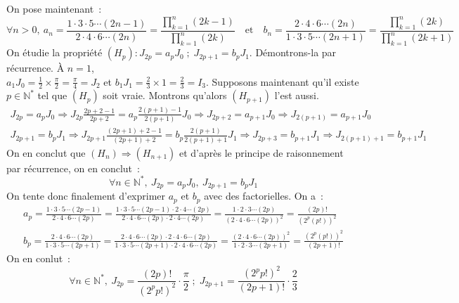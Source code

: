 \documentclass{article}
\begin{document}
  On pose maintenant~:
  \begin{displaymath}
    \forall n>0,\ a_n = \frac{1\cdot3\cdot5\cdots(2n-1)}{2\cdot4\cdot6\cdots(2n)}=\frac{\prod_{k=1}^n (2k-1)}{\prod_{k=1}^n(2k)} \quad\text{et}\quad b_n = \frac{2\cdot4\cdot6\cdots(2n)}{1\cdot3\cdot5\cdots(2n+1)}= \frac{\prod_{k=1}^n(2k)}{\prod_{k=1}^n (2k+1)}
  \end{displaymath}
  On étudie la propriété $(H_p): J_{2p} = a_pJ_0\;;\; J_{2p+1} = b_pJ_1$. Démontrons-la par récurrence. À $n=1$, \\ $a_1J_0 = \frac{1}{2}\times\frac{\pi}{2}=\frac{\pi}{4}=J_2$ et $b_1J_1=\frac{2}{3}\times 1 = \frac{2}{3}=I_3$.
  Supposons maintenant qu'il existe $p\in\mathbb{N}^*$ tel que $(H_p)$ soit vraie. Montrons qu'alors $(H_{p+1})$ l'est aussi.
  \begin{align*}
    J_{2p} = a_p J_0 \Longrightarrow J_{2p}\frac{2p+2-1}{2p+2}= a_p \frac{2(p+1)-1}{2(p+1)}J_0 \Longrightarrow J_{2p+2} = a_{p+1}J_0 \Longrightarrow J_{2(p+1)}=a_{p+1}J_0 \\
    J_{2p+1}=b_pJ_1 \Longrightarrow J_{2p+1}\frac{(2p+1)+2-1}{(2p+1)+2} =b_p\frac{2(p+1)}{2(p+1)+1}J_1 \Longrightarrow J_{2p+3}=b_{p+1}J_1 \Longrightarrow J_{2(p+1)+1}=b_{p+1}J_1
  \end{align*}
  On en conclut que $(H_n)\Rightarrow(H_{n+1})$ et d'après le principe de raisonnement par récurrence, on en conclut~:
  \begin{displaymath}
    \forall n\in\mathbb{N}^*,\ J_{2p}=a_pJ_0,\ J_{2p+1}=b_pJ_1
  \end{displaymath}
  On tente donc finalement d'exprimer $a_p$ et $b_p$ avec des factorielles. On a~:
  \begin{align*}
    a_p = \frac{1\cdot3\cdot5\cdots(2p-1)}{2\cdot4\cdot6\cdots(2p)}= \frac{1\cdot3\cdot5\cdots(2p-1)\cdot2\cdot4\cdots(2p)}{2\cdot4\cdot6\cdots(2p)\cdot2\cdot4\cdots(2p)}= \frac{1\cdot2\cdot3\cdots(2p)}{(2\cdot4\cdot6\cdots(2p))^2}=\frac{(2p)!}{\left(2^p(p!)\right)^2} \\
    b_p = \frac{2\cdot4\cdot6\cdots(2p)}{1\cdot3\cdot5\cdots(2p+1)}= \frac{2\cdot4\cdot6\cdots(2p)\cdot2\cdot4\cdot6\cdots(2p)}{1\cdot3\cdot5\cdots(2p+1)\cdot2\cdot4\cdot6\cdots(2p)} = \frac{(2\cdot4\cdot6\cdots(2p))^2}{1\cdot2\cdot3\cdots(2p+1)}= \frac{\left(2^p(p!)\right)^2}{(2p+1)!}
  \end{align*}
  On en conlut~:
  \begin{displaymath}
    \forall n\in\mathbb{N}^*,\ J_{2p}=\frac{(2p)!}{\left(2^pp!\right)^2}\cdot\frac{\pi}{2}\;;\; J_{2p+1} = \frac{\left(2^pp!\right)^2}{(2p+1)!} \cdot \frac{2}{3}
  \end{displaymath}
\end{document}
